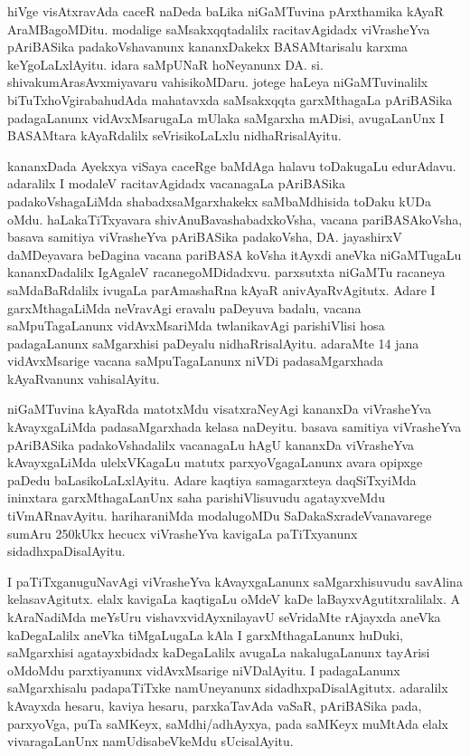\medskip

hiVge visAtxravAda caceR naDeda baLika niGaMTuvina pArxthamika kAyaR AraMBagoMDitu. modalige saMsakxqqta\-dalilx racita\-vAgidadx viVrasheYva pAriBASika padakoVshavanunx kananxDakekx BASAMtarisalu karxma keYgoLaLxlAyitu. idara saMpUNaR \hbox{hoNeyanunx} DA. si. shivakumAra\-sAvxmiyavaru vahisikoMDaru. jotege haLeya niGaMTuvinalilx biTuTxhoVgirabahudAda mahatavxda saMsakxqqta garxMthagaLa pAriBASika padagaLanunx vidAvxMsarugaLa mUlaka saMgarxha mADisi, avugaLanUnx I BASAMtara kAyaRdalilx seVrisikoLaLxlu nidhaRrisalAyitu.

\medskip

kananxDada Ayekxya viSaya caceRge baMdAga halavu toDakugaLu edurAdavu. adaralilx I modaleV racitavAgidadx vacanagaLa pAriBASika padakoVshagaLiMda shabadxsaMgarxhakekx saMbaMdhisida toDaku kUDa oMdu. haLakaTiTxyavara shivAnuBavashabadxkoVsha, vacana pariBASA\-koVsha, basava samitiya viVrasheYva pAriBASika padakoVsha, DA. jayashirxV daMDeyavara beDagina vacana pariBASA koVsha itAyxdi aneVka niGaMTugaLu kananxDadalilx IgAgaleV racanegoMDidadxvu. parxsutxta niGaMTu racaneya saMdaBaRdalilx ivugaLa parAmashaRna kAyaR anivAyaRvAgitutx. Adare I garxMthagaLiMda neVravAgi eravalu paDeyuva badalu, vacana saMpuTagaLanunx vidAvxMsariMda twlanika\-vAgi parishiVlisi hosa padagaLanunx saMgarxhisi paDeyalu nidhaRrisalAyitu. adaraMte 14 jana vidAvxMsarige vacana saMpuTagaLanunx niVDi padasaMgarxhada kAyaRvanunx vahisalAyitu.

\medskip

niGaMTuvina kAyaRda matotxMdu visatxraNeyAgi kananxDa viVrasheYva kAvayxgaLiMda padasaMgarxhada kelasa naDeyitu. basava \hbox{samitiya} viVrasheYva pAriBASika padakoVshadalilx vacanagaLu hAgU kananxDa viVrasheYva kAvayxgaLiMda ulelxVKagaLu matutx parxyoVga\-gaLanunx avara opipxge paDedu baLasikoLaLxlAyitu. Adare kaqtiya samagarxteya daqSiTxyiMda ininxtara garxMthagaLanUnx saha parishiVlisuvudu agatayxveMdu tiVmARnavAyitu. hariharaniMda modalugoMDu SaDakaSxradeVvanavarege sumAru 250kUkx hecucx viVrasheYva kavigaLa paTiTxyanunx sidadhxpaDisalAyitu. 

\medskip

I paTiTxganuguNavAgi viVrasheYva kAvayxgaLanunx saMgarxhisuvudu savAlina kelasavAgitutx. elalx kavigaLa kaqtigaLu oMdeV kaDe laBayxvAgutitxralilalx. A kAraNadiMda meYsUru vishavxvidAyxnilayavU seVridaMte rAjayxda aneVka kaDegaLalilx aneVka tiMgaLugaLa kAla I garxMthagaLanunx huDuki, saMgarxhisi agatayxbidadx kaDegaLalilx avugaLa nakalugaLanunx tayArisi oMdoMdu parxtiyanunx vidAvxMsarige niVDa\-lAyitu. I padagaLanunx saMgarxhisalu padapaTiTxke namUneyanunx sidadhxpaDisalAgitutx. adaralilx kAvayxda hesaru, kaviya hesaru, parxkaTavAda vaSaR, pAriBASika pada, parxyoVga, puTa saMKeyx, saMdhi/adhAyxya, pada saMKeyx muMtAda elalx vivaragaLanUnx namUdisa\-beVkeMdu sUcisalAyitu.

